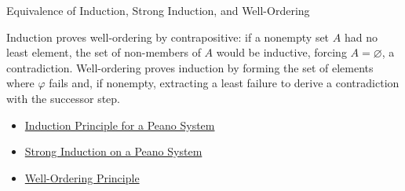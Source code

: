\begin{topicbox}{Equivalence of Induction, Strong Induction, and Well-Ordering}
\begin{remark*}[Interpretation]
Induction proves well-ordering by contrapositive: if a nonempty set $A$ had
no least element, the set of non-members of $A$ would be inductive, forcing
$A = \varnothing$, a contradiction. Well-ordering proves induction by forming
the set of elements where $\varphi$ fails and, if nonempty, extracting a
least failure to derive a contradiction with the successor step.
\end{remark*}

\begin{dependencies}
\begin{itemize}
  \item \hyperref[thm:induction-principle-for-peano-system]{Induction Principle for a Peano System}
  \item \hyperref[thm:strong-induction-on-peano-system]{Strong Induction on a Peano System}
  \item \hyperref[thm:well-ordering-principle]{Well-Ordering Principle}
\end{itemize}
\end{dependencies}
\end{topicbox}
